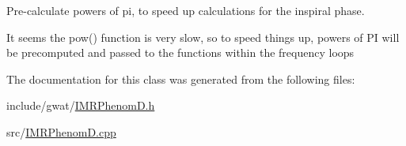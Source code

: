 Pre-\/calculate powers of pi, to speed up calculations for the inspiral phase. 

It seems the pow() function is very slow, so to speed things up, powers of PI will be precomputed and passed to the functions within the frequency loops 

The documentation for this class was generated from the following files\+:\begin{DoxyCompactItemize}
\item 
include/gwat/\hyperlink{IMRPhenomD_8h}{I\+M\+R\+Phenom\+D.\+h}\item 
src/\hyperlink{IMRPhenomD_8cpp}{I\+M\+R\+Phenom\+D.\+cpp}\end{DoxyCompactItemize}
